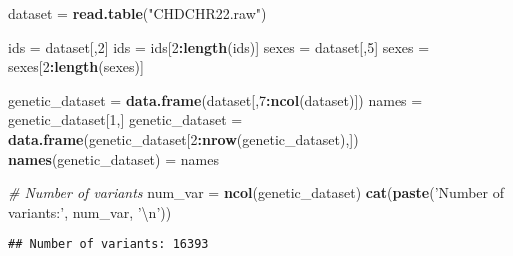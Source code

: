 \documentclass[
]{article}
\newenvironment{Shaded}{\begin{snugshade}}{\end{snugshade}}
\newcommand{\CharTok}[1]{\textcolor[rgb]{0.31,0.60,0.02}{#1}}
\newcommand{\CommentTok}[1]{\textcolor[rgb]{0.56,0.35,0.01}{\textit{#1}}}
\newcommand{\DecValTok}[1]{\textcolor[rgb]{0.00,0.00,0.81}{#1}}
\newcommand{\KeywordTok}[1]{\textcolor[rgb]{0.13,0.29,0.53}{\textbf{#1}}}
\newcommand{\NormalTok}[1]{#1}
\newcommand{\OperatorTok}[1]{\textcolor[rgb]{0.81,0.36,0.00}{\textbf{#1}}}
\newcommand{\OtherTok}[1]{\textcolor[rgb]{0.56,0.35,0.01}{#1}}
\newcommand{\StringTok}[1]{\textcolor[rgb]{0.31,0.60,0.02}{#1}}
\begin{document}
\begin{Shaded}
\begin{Highlighting}[]
\NormalTok{dataset =}\StringTok{ }\KeywordTok{read.table}\NormalTok{(}\StringTok{"CHDCHR22.raw"}\NormalTok{)}

\NormalTok{ids =}\StringTok{ }\NormalTok{dataset[,}\DecValTok{2}\NormalTok{]}
\NormalTok{ids =}\StringTok{ }\NormalTok{ids[}\DecValTok{2}\OperatorTok{:}\KeywordTok{length}\NormalTok{(ids)]}
\NormalTok{sexes =}\StringTok{ }\NormalTok{dataset[,}\DecValTok{5}\NormalTok{]}
\NormalTok{sexes =}\StringTok{ }\NormalTok{sexes[}\DecValTok{2}\OperatorTok{:}\KeywordTok{length}\NormalTok{(sexes)]}

\NormalTok{genetic_dataset =}\StringTok{ }\KeywordTok{data.frame}\NormalTok{(dataset[,}\DecValTok{7}\OperatorTok{:}\KeywordTok{ncol}\NormalTok{(dataset)])}
\NormalTok{names =}\StringTok{ }\NormalTok{genetic_dataset[}\DecValTok{1}\NormalTok{,]}
\NormalTok{genetic_dataset =}\StringTok{ }\KeywordTok{data.frame}\NormalTok{(genetic_dataset[}\DecValTok{2}\OperatorTok{:}\KeywordTok{nrow}\NormalTok{(genetic_dataset),])}
\KeywordTok{names}\NormalTok{(genetic_dataset) =}\StringTok{ }\NormalTok{names}

\CommentTok{# Number of variants}
\NormalTok{num_var =}\StringTok{ }\KeywordTok{ncol}\NormalTok{(genetic_dataset)}
\KeywordTok{cat}\NormalTok{(}\KeywordTok{paste}\NormalTok{(}\StringTok{'Number of variants:'}\NormalTok{, num_var, }\StringTok{'}\CharTok{\textbackslash{}n}\StringTok{'}\NormalTok{))}
\end{Highlighting}
\end{Shaded}

\begin{verbatim}
## Number of variants: 16393
\end{verbatim}

\begin{Shaded}
\end{Shaded}
\end{document}
